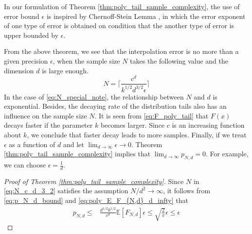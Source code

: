 \documentclass[conference,a4paper]{IEEEtran}
\def\E{\mathbb{E}}
\begin{document}
In our formulation of Theorem \ref{thm:poly_tail_sample_complexity},
the use of error bound $\epsilon$ is inspired by Chernoff-Stein Lemma \cite{cover1999elements},
in which the error exponent of one type of error is obtained on condition that the another type of error is upper bounded by $\epsilon$.

From the above theorem, we see that the interpolation error is no more than a given precision $\epsilon$,
when the sample size $N$ takes the following value
and the dimension $d$ is large enough.
\begin{equation}\label{eq:N_special_note}
   N = \Big\lceil \frac{c^d}{k^{1/2}d^{3/2} \epsilon} \Big\rceil
\end{equation}
In the case of \eqref{eq:N_special_note}, the relationship between $N$ and $d$ is exponential.
Besides, the decaying rate of the distribution tails also has an influence on the sample size $N$.
It is seen from \eqref{eq:F_poly_tail} that $F(x)$ decays faster if the parameter $k$
becomes larger.
Since $c$ is an increasing function about $k$,
we conclude that faster decay leads to more samples.
Finally, if we treat $\epsilon$ as a function of $d$ and let $\lim_{d\to\infty}\epsilon \to 0$.
Theorem \ref{thm:poly_tail_sample_complexity} implies that $\lim_{d\to\infty} p_{N,d} = 0$.
For example, we can choose $\epsilon=\frac{1}{d}$.

\begin{proof}[Proof of Theorem \ref{thm:poly_tail_sample_complexity}]

Since $N$ in \eqref{eq:N_c_d_3_2} satisfies the assumption $N/d^2 \to \infty$,
it follows from \eqref{eq:p_N_d_bound} and \eqref{eq:poly_E_F_{N,d}_d_infty} that
\begin{align*}
p_{N,d} \leq &\frac{d^{1/2}k^{1/2}}{c^d} \E[F_{N,d}]\epsilon
\leq \sqrt{\frac{2}{\pi}}\epsilon \leq \epsilon
\end{align*}
\end{proof}
\end{document}
